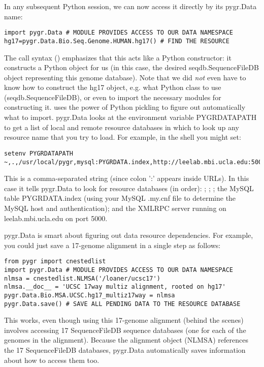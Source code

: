 \documentclass{howto}
\begin{document}
In any subsequent Python session, we can now access it directly by its
pygr.Data name:
\begin{verbatim}
import pygr.Data # MODULE PROVIDES ACCESS TO OUR DATA NAMESPACE
hg17=pygr.Data.Bio.Seq.Genome.HUMAN.hg17() # FIND THE RESOURCE
\end{verbatim}
The call syntax () emphasizes that this acts like a Python
constructor: it constructs a Python object for us (in this case, the
desired seqdb.SequenceFileDB object representing this genome database).
Note that we did {\em not} even have to know how to construct the hg17 
object, e.g. what Python class to use (seqdb.SequenceFileDB), or even to import
the necessary modules for constructing it.   uses the
power of Python pickling to figure out automatically what to import.
pygr.Data looks at the environment variable PYGRDATAPATH to get a list 
of local and remote resource databases in which to look up any resource name
that you try to load.  For example, in the shell you might set:
\begin{verbatim}
setenv PYGRDATAPATH ~,.,/usr/local/pygr,mysql:PYGRDATA.index,http://leelab.mbi.ucla.edu:5000
\end{verbatim}
This is a comma-separated string (since colon ':' appears inside URLs).
In this case it tells pygr.Data to look for resource databases (in order):
; ; ;
the MySQL table PYGRDATA.index (using your
MySQL .my.cnf file to determine the MySQL host and authentication);
and the XMLRPC server running on leelab.mbi.ucla.edu on port 5000.

pygr.Data is smart about figuring out data resource dependencies.
For example, you could just save a 17-genome alignment in a single step
as follows:
\begin{verbatim}
from pygr import cnestedlist
import pygr.Data # MODULE PROVIDES ACCESS TO OUR DATA NAMESPACE
nlmsa = cnestedlist.NLMSA('/loaner/ucsc17')
nlmsa.__doc__ = 'UCSC 17way multiz alignment, rooted on hg17'
pygr.Data.Bio.MSA.UCSC.hg17_multiz17way = nlmsa
pygr.Data.save() # SAVE ALL PENDING DATA TO THE RESOURCE DATABASE
\end{verbatim}
This works, even though using this 17-genome alignment (behind the
scenes) involves accessing 17 SequenceFileDB sequence databases (one for each
of the genomes in the alignment).  Because the alignment object (NLMSA)
references the 17 SequenceFileDB databases, pygr.Data automatically saves information
about how to access them too.
\end{document}
